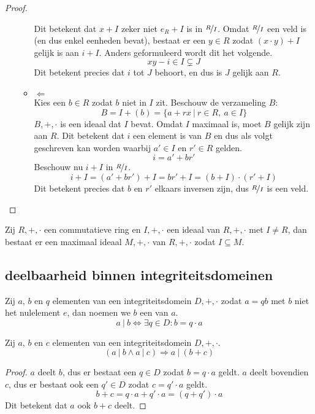 \documentclass[main.tex]{subfiles}
\begin{document}
\begin{st}
\begin{proof}
\begin{itemize}
\begin{itemize}
        Dit betekent dat $x+I$ zeker niet $e_{R}+I$ is in $\nicefrac{R}{I}$.
        Omdat $\nicefrac{R}{I}$ een veld is (en dus enkel eenheden bevat), bestaat er een $y\in R$ zodat $(x\cdot y) + I$ gelijk is aan $i + I$.
        Anders geformuleerd wordt dit het volgende.
        \[ xy-i \in I \subsetneq J \]
        Dit betekent precies dat $i$ tot $J$ behoort, en dus is $J$ gelijk aan $R$.
      \item $\Leftarrow$\\
        Kies een $b\in R$ zodat $b$ niet in $I$ zit. 
        Beschouw de verzameling $B$:
        \[ B = I+(b) = \{ a + rx \ |\ r\in R,\ a \in I \}\]
        $B,+,\cdot$ is een ideaal dat $I$ bevat.
        Omdat $I$ maximaal is, moet $B$ gelijk zijn aan $R$.
        Dit betekent dat $i$ een element is van $B$ en dus als volgt geschreven kan worden waarbij $a'\in I$ en $r'\in R$ gelden.
        \[ i = a' + br'\]
        Beschouw nu $i+I$ in $\nicefrac{R}{I}$.
        \[ i+I = (a' + br') + I = br' + I = (b+I) \cdot (r'+I) \]
        Dit betekent precies dat $b$ en $r'$ elkaars inversen zijn, dus $\nicefrac{R}{I}$ is een veld.\waarom {}
      \end{itemize}
    \end{itemize}
  \end{proof}
\end{st}

\begin{st}
  Zij $R,+,\cdot$ een commutatieve ring en $I,+,\cdot$ een ideaal van $R,+,\cdot$ met $I\neq R$, dan bestaat er een maximaal ideaal $M,+,\cdot$ van $R,+,\cdot$ zodat $I \subseteq M$.
  \zb
\end{st}


\subsection{deelbaarheid binnen integriteitsdomeinen}
\label{sec:deelbaarheid-binnen-integriteitsdomeinen}

\begin{de}
  Zij $a$, $b$ en $q$ elementen van een integriteitsdomein $D,+,\cdot$ zodat $a= qb$ met $b$ niet het nulelement $e$, dan noemen we $b$ een  van $a$.
  \[ a\ |\ b \Leftrightarrow \exists q \in D: b = q\cdot a \]
\end{de}

\begin{st}
  Zij $a$, $b$ en $c$ elementen van een integriteitsdomein $D,+,\cdot$.
  \[ (a\ |\ b \wedge a\ |\ c) \Rightarrow a\ |\ (b+c) \]

  \begin{proof}
    $a$ deelt $b$, dus er bestaat een $q \in D$ zodat $b=q\cdot a$ geldt.
    $a$ deelt bovendien $c$, dus er bestaat ook een $q'\in D$ zodat $c = q'\cdot a$ geldt. 
    \[
      b + c = q\cdot a + q'\cdot a = (q+q')\cdot a 
    \]
    Dit betekent dat $a$ ook $b+c$ deelt.
  \end{proof}
\end{st}
\end{document}
